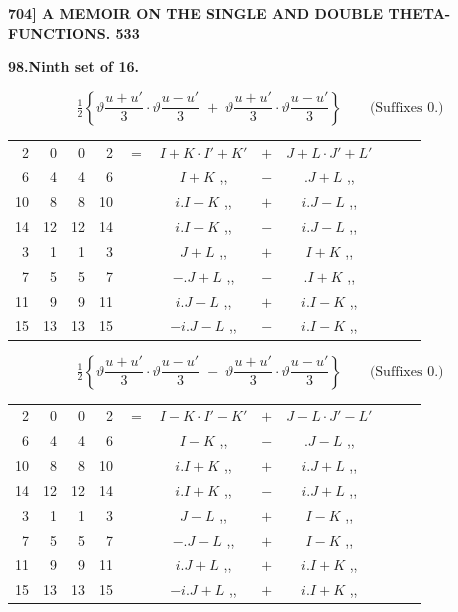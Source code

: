 \documentclass[11pt]{article}
\newcommand{\half}{\tfrac{1}{2}}
\begin{document}
\newpage
\noindent\textbf{704] \quad A MEMOIR ON THE SINGLE AND DOUBLE THETA-FUNCTIONS. \hfill 533}

\medskip
\begin{center}\textbf{98.\quad Ninth set of 16.}\end{center}

\[
\half\!\left\{\vartheta\frac{u+u'}{3}\cdot\vartheta\frac{u-u'}{3}\;+\;\vartheta\frac{u+u'}{3}\cdot\vartheta\frac{u-u'}{3}\right\}\qquad\text{(Suffixes 0.)}
\]
{\small
\begin{center}
\begin{tabular}{rrrrr@{\ }c@{\ }lcr@{\ }c@{\ }l}
2  & 0  & 0  & 2  & $=$ & $I+K\cdot I'+K'$ & $+$ & $J+L\cdot J'+L'$ \\
6  & 4  & 4  & 6  & & $I+K$ \quad ,, & $-$ & $.J+L$ \quad ,, \\
10 & 8  & 8  & 10 & & $i.I-K$ \quad ,, & $+$ & $i.J-L$ \quad ,, \\
14 & 12 & 12 & 14 & & $i.I-K$ \quad ,, & $-$ & $i.J-L$ \quad ,, \\
3  & 1  & 1  & 3  & & $J+L$ \quad ,, & $+$ & $I+K$ \quad ,, \\
7  & 5  & 5  & 7  & & $-.J+L$ \quad ,, & $-$ & $.I+K$ \quad ,, \\
11 & 9  & 9  & 11 & & $i.J-L$ \quad ,, & $+$ & $i.I-K$ \quad ,, \\
15 & 13 & 13 & 15 & & $-i.J-L$ \quad ,, & $-$ & $i.I-K$ \quad ,, \\
\end{tabular}
\end{center}
}

\[
\half\!\left\{\vartheta\frac{u+u'}{3}\cdot\vartheta\frac{u-u'}{3}\;-\;\vartheta\frac{u+u'}{3}\cdot\vartheta\frac{u-u'}{3}\right\}\qquad\text{(Suffixes 0.)}
\]
{\small
\begin{center}
\begin{tabular}{rrrrr@{\ }c@{\ }lcr@{\ }c@{\ }l}
2  & 0  & 0  & 2  & $=$ & $I-K\cdot I'-K'$ & $+$ & $J-L\cdot J'-L'$ \\
6  & 4  & 4  & 6  & & $I-K$ \quad ,, & $-$ & $.J-L$ \quad ,, \\
10 & 8  & 8  & 10 & & $i.I+K$ \quad ,, & $+$ & $i.J+L$ \quad ,, \\
14 & 12 & 12 & 14 & & $i.I+K$ \quad ,, & $-$ & $i.J+L$ \quad ,, \\
3  & 1  & 1  & 3  & & $J-L$ \quad ,, & $+$ & $I-K$ \quad ,, \\
7  & 5  & 5  & 7  & & $-.J-L$ \quad ,, & $+$ & $I-K$ \quad ,, \\
11 & 9  & 9  & 11 & & $i.J+L$ \quad ,, & $+$ & $i.I+K$ \quad ,, \\
15 & 13 & 13 & 15 & & $-i.J+L$ \quad ,, & $+$ & $i.I+K$ \quad ,, \\
\end{tabular}
\end{center}
}
\end{document}
